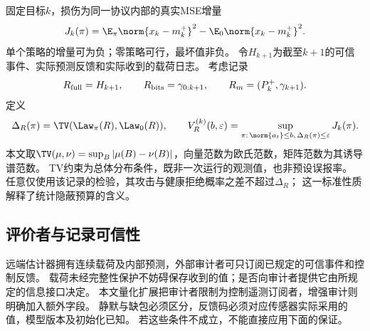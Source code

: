 固定目标$k$，损伤为同一协议内部的真实MSE增量
\begin{equation}
J_k(\pi)=\E_\pi\norm{x_k-m_k^+}^2-\E_0\norm{x_k-m_k^+}^2.
\label{eq:damage}
\end{equation}
单个策略的增量可为负；零策略可行，最坏值非负。
令$H_{k+1}$为截至$k+1$的可信事件、实际预测反馈和实际收到的载荷日志。
考虑记录
\[
R_{\rm full}=H_{k+1},\qquad
R_{\rm bits}=\gamma_{0:k+1},\qquad
R_m=(P_k^+,\gamma_{k+1}).
\]
定义
\begin{equation}
\Delta_R(\pi)=\TV(\Law_\pi(R),\Law_0(R)),\qquad
V_R^{(k)}(b,\varepsilon)=
\sup_{\pi:\,\norm{a_t}\le b,\,\Delta_R(\pi)\le\varepsilon}J_k(\pi).
\label{eq:value}
\end{equation}
本文取$\TV(\mu,\nu)=\sup_B|\mu(B)-\nu(B)|$，向量范数为欧氏范数，矩阵范数为其诱导谱范数。
TV约束为总体分布条件，既非一次运行的观测值，也非预设误报率。
任意仅使用该记录的检验，其攻击与健康拒绝概率之差不超过$\Delta_R$；
这一标准性质解释了统计隐蔽预算的含义。

\subsection{评价者与记录可信性}
远端估计器拥有连续载荷及内部预测，外部审计者可只订阅已规定的可信事件和控制反馈。
载荷未经完整性保护不妨碍保存收到的值；是否向审计者提供它由所规定的信息接口决定。
本文量化扩展把审计者限制为控制遥测订阅者，增强审计则明确加入额外字段。
静默与缺包必须区分，反馈码必须对应传感器实际采用的值，模型版本及初始化已知。
若这些条件不成立，不能直接应用下面的保证。
